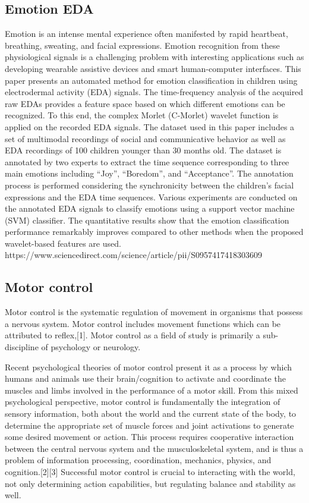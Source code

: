 \subsection{Emotion EDA}
Emotion is an intense mental experience often manifested by rapid heartbeat, breathing, 
sweating, and facial expressions. Emotion recognition from these physiological signals 
is a challenging problem with interesting applications such as developing wearable 
assistive devices and smart human-computer interfaces. This paper presents an automated 
method for emotion classification in children using electrodermal activity (EDA) signals. 
The time-frequency analysis of the acquired raw EDAs provides a feature space based on 
which different emotions can be recognized. To this end, the complex Morlet (C-Morlet) 
wavelet function is applied on the recorded EDA signals. The dataset used in this paper 
includes a set of multimodal recordings of social and communicative behavior as well 
as EDA recordings of 100 children younger than 30 months old. The dataset is annotated 
by two experts to extract the time sequence corresponding to three main emotions 
including “Joy”, “Boredom”, and “Acceptance”. The annotation process is performed 
considering the synchronicity between the children's facial expressions and the EDA 
time sequences. Various experiments are conducted on the annotated EDA signals to 
classify emotions using a support vector machine (SVM) classifier. The quantitative 
results show that the emotion classification performance remarkably improves compared 
to other methods when the proposed wavelet-based features are used.
https://www.sciencedirect.com/science/article/pii/S0957417418303609

\subsection{Motor control}
Motor control is the systematic regulation of movement in organisms that possess 
a nervous system. Motor control includes movement functions which can be attributed 
to reflex,[1]. Motor control as a field of study is primarily a sub-discipline of 
psychology or neurology.

Recent psychological theories of motor control present it as a process by which 
humans and animals use their brain/cognition to activate and coordinate the muscles 
and limbs involved in the performance of a motor skill. From this mixed psychological 
perspective, motor control is fundamentally the integration of sensory information, 
both about the world and the current state of the body, to determine the appropriate 
set of muscle forces and joint activations to generate some desired movement or action. 
This process requires cooperative interaction between the central nervous system and 
the musculoskeletal system, and is thus a problem of information processing, 
coordination, mechanics, physics, and cognition.[2][3] Successful motor control 
is crucial to interacting with the world, not only determining action capabilities, 
but regulating balance and stability as well.

